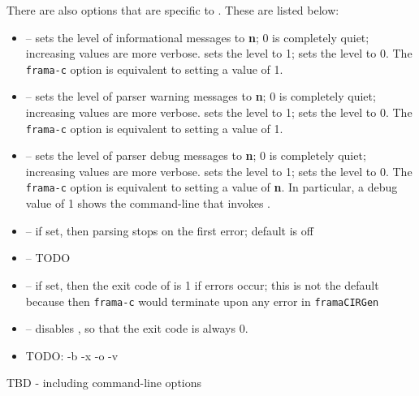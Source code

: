 There are also options that are specific to \fcl.
These are listed below:
\begin{itemize}
	\item {} -- sets the level of informational messages to \textbf{n}; 0 is completely quiet; increasing values are
	more verbose.  sets the level to 1; 
	 sets the level to 0. The \lstinline|frama-c| option  is equivalent to setting a value of 1.
	\item {} -- sets the level of parser warning messages to \textbf{n}; 0 is completely quiet; increasing values are
more verbose.  sets the level to 1; 
 sets the level to 0. The \lstinline|frama-c| option  is equivalent to setting a value of 1.

	\item {} -- sets the level of parser debug messages to \textbf{n}; 0 is completely quiet; increasing values are
more verbose.  sets the level to 1; 
 sets the level to 0. 
The \lstinline|frama-c| option  is equivalent to setting a value of \textbf{n}.
In particular, a debug value of 1 shows the command-line that invokes \irg.
	\item {} -- if set, then parsing stops on the first error; default is off
	\item {} -- TODO
	\item {} -- if set, then the exit code of \irg is 1 if errors occur; this is not the default because then \lstinline|frama-c| would terminate upon
	any error in \lstinline|framaCIRGen|
	\item {} -- disables , so that the exit code is always 0.

\item TODO: -b -x -o -v
	
\end{itemize}


TBD - including command-line options

